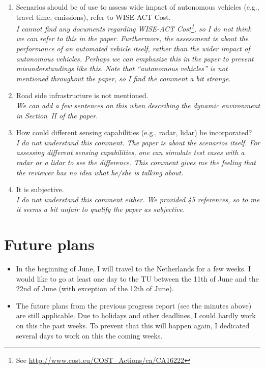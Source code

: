 \documentclass[10pt,final,a4paper,oneside,onecolumn]{article}
\begin{document}
\begin{itemize}
\begin{enumerate}
		\item Scenarios should be of use to assess wide impact of autonomous vehicles (e.g., travel time, emissions), refer to WISE-ACT Cost.\\
		\textit{I cannot find any documents regarding WISE-ACT Cost\footnote{See \url{http://www.cost.eu/COST_Actions/ca/CA16222}}, so I do not think we can refer to this in the paper. Furthermore, the assessment is about the performance of an automated vehicle itself, rather than the wider impact of autonomous vehicles. Perhaps we can emphasize this in the paper to prevent misunderstandings like this. Note that ``autonomous vehicles'' is not mentioned throughout the paper, so I find the comment a bit strange.}
		
		\item Road side infrastructure is not mentioned.\\
		\textit{We can add a few sentences on this when describing the dynamic environment in Section~II of the paper.}
		
		\item How could different sensing capabilities (e.g., radar, lidar) be incorporated?\\
		\textit{I do not understand this comment. The paper is about the scenarios itself. For assessing different sensing capabilities, one can simulate test cases with a radar or a lidar to see the difference. This comment gives me the feeling that the reviewer has no idea what he/she is talking about.}
		
		\item It is subjective. \\
		\textit{I do not understand this comment either. We provided 45 references, so to me it seems a bit unfair to qualify the paper as subjective.}
	\end{enumerate}
\end{itemize}

\section{Future plans}

\begin{itemize}
	\item In the beginning of June, I will travel to the Netherlands for a few weeks. I would like to go at least one day to the TU between the 11th of June and the 22nd of June (with exception of the 12th of June).
	
	\item The future plans from the previous progress report (see the minutes above) are still applicable. Due to holidays and other deadlines, I could hardly work on this the past weeks. To prevent that this will happen again, I dedicated several days to work on this the coming weeks.
\end{itemize}
\end{document}
